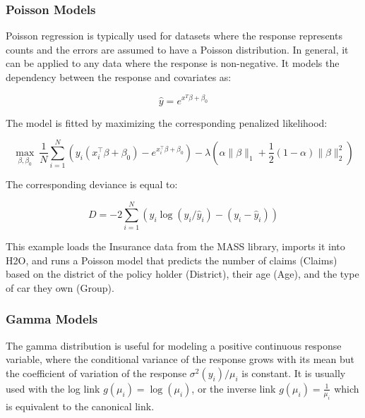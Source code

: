 \waterExampleInPython



\subsubsection{Poisson Models}
Poisson regression is typically used for datasets where the response represents counts and the errors are assumed to have a Poisson distribution. In general, it can be applied to any data where the response is non-negative. It models the dependency between the response and covariates as: 
\nowidow[3]

$$\hat{y} = e^{x^T\beta + \beta_0}$$

The model is fitted by maximizing the corresponding penalized likelihood:

$$  \max_{\beta,\beta_0}  \ \frac{1}{N} \sum_{i=1}^{N}  \left(   y_i (x_i^{\top}\beta  + \beta_0) - e^{x_i^{\top}\beta  + \beta_0} \right) 
- \lambda \left(\alpha \|\beta \|_1 + \frac{1}{2}(1-\alpha) \| \beta \|_2^2 \right)$$

The corresponding deviance is equal to: 

$$D = -2\sum_{i=1}^{N} \left( y_i \log(y_i/\hat{y}_i) - ( y_i - \hat{y}_i  ) \right)$$


This example loads the Insurance data from the MASS library, imports it into H2O, and runs a Poisson model that predicts the number of claims (Claims) based on the district of the policy holder (District), their age (Age), and the type of car they
own (Group).

\waterExampleInR


\waterExampleInPython


\newpage
\subsubsection{Gamma Models}
The gamma distribution is useful for modeling a positive continuous response variable, where the conditional
variance of the response grows with its mean but the coefficient of variation of the response $\sigma^2(y_i)/\mu_i$ is
constant. It is usually used with the log link $g(\mu_i)= \log(\mu_i)$, or the inverse link $g(\mu_i) = \frac{1}{\mu_i} $ which is equivalent to the canonical link.

